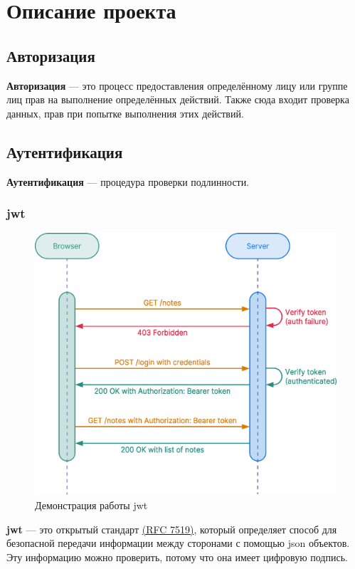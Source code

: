 \section{Описание проекта}
\subsection{Авторизация}
\textbf{Авторизация} --- это процесс предоставления определённому лицу или группе лиц прав на выполнение определённых действий. Также сюда входит проверка данных, прав при попытке выполнения этих действий.

\subsection{Аутентификация}
\textbf{Аутентификация} --- процедура проверки подлинности.

\subsubsection{\acrfull{jwt}}
\begin{figure}[h!]
    \begin{center}
        \includegraphics[scale=0.4]{images/jwt-example.eps}
        \caption{Демонстрация работы \acrshort{jwt}}
    \end{center}
\end{figure}

\textbf{\acrfull{jwt}} --- это открытый стандарт \href{https://tools.ietf.org/html/rfc7519}{(RFC 7519)}, который определяет способ для безопасной передачи информации между сторонами с помощью \acrshort{json} объектов. Эту информацию можно проверить, потому что она имеет цифровую подпись.

